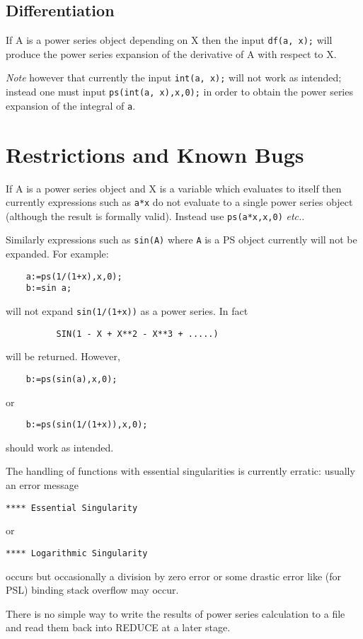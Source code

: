 \subsection{Differentiation}

If A is a power series object depending on X then the input
{\tt df(a, x);} will produce the power series expansion of the
derivative of A with respect to X.

{\em Note} however that currently the input  {\tt int(a, x);} will
not work as intended; instead one must input
{\tt ps(int(a, x),x,0);}
in order to obtain the power series expansion of the integral of
{\tt a}.

\section{Restrictions and Known Bugs}

If A is a power series object and X is a variable
which evaluates to itself then currently expressions such as {\tt a*x}
do not evaluate to a single power series object (although the 
result is formally valid).  Instead use {\tt ps(a*x,x,0)} {\em etc.}.

Similarly expressions such as {\tt sin(A)} where {\tt A} is a PS object
currently will not be expanded. For example:

\begin{verbatim}
    a:=ps(1/(1+x),x,0);
    b:=sin a;
\end{verbatim}

will not expand {\tt sin(1/(1+x))} as a power series. In fact

\begin{verbatim}
          SIN(1 - X + X**2 - X**3 + .....)
\end{verbatim}

will be returned. However,

\begin{verbatim} 
    b:=ps(sin(a),x,0);
\end{verbatim}

or

\begin{verbatim} 
    b:=ps(sin(1/(1+x)),x,0);
\end{verbatim}

should work as intended.

The handling of functions with essential singularities is currently
erratic: usually an error message

\hspace*{2em} {\tt ***** Essential Singularity}

or

\hspace*{2em} {\tt ***** Logarithmic Singularity}

occurs but occasionally a division by
zero error or some drastic error like (for PSL) binding stack
overflow may occur.
 
There is no simple way to write the results of power series
calculation to a file and read them back into REDUCE at a later
stage.

